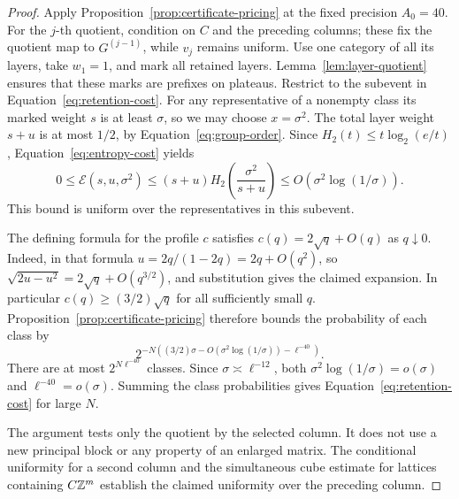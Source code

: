 \begin{proof}
Apply Proposition~\ref{prop:certificate-pricing} at the fixed precision
\(A_0=40\). For the \(j\)-th quotient, condition on \(C\) and the
preceding columns; these fix the quotient map to \(G^{(j-1)}\), while
\(v_j\) remains uniform. Use one category of all its layers, take
\(w_1=1\), and mark all retained layers. Lemma~\ref{lem:layer-quotient}
ensures that these marks are prefixes on plateaus. Restrict to the
subevent in Equation~\eqref{eq:retention-cost}. For any representative
of a nonempty class its marked weight \(s\) is at least \(\sigma\),
so we may choose \(x=\sigma^2\). The total layer weight \(s+u\) is
at most \(1/2\), by Equation~\eqref{eq:group-order}. Since
\(H_2(t)\le t\log_2(e/t)\), Equation~\eqref{eq:entropy-cost} yields
\[
 0\le\mathcal E(s,u,\sigma^2)
 \le (s+u)H_2\!\left(\frac{\sigma^2}{s+u}\right)
 \le O\!\left(\sigma^2\log(1/\sigma)\right).
\]
This bound is uniform over the representatives in this subevent.

The defining formula for the profile \(c\) satisfies
\(c(q)=2\sqrt q+O(q)\) as \(q\downarrow0\). Indeed, in that formula
\(u=2q/(1-2q)=2q+O(q^2)\), so
\(\sqrt{2u-u^2}=2\sqrt q+O(q^{3/2})\), and substitution gives the
claimed expansion. In particular \(c(q)\ge(3/2)\sqrt q\) for all
sufficiently small \(q\). Proposition~\ref{prop:certificate-pricing}
therefore bounds the probability of each class by
\[
 2^{-N\left((3/2)\sigma
       -O(\sigma^2\log(1/\sigma))-\ell^{-40}\right)}.
\]
There are at most \(2^{N\ell^{-40}}\) classes. Since
\(\sigma\asymp\ell^{-12}\), both
\(\sigma^2\log(1/\sigma)=o(\sigma)\) and
\(\ell^{-40}=o(\sigma)\). Summing the class probabilities gives
Equation~\eqref{eq:retention-cost} for large \(N\).

The argument tests only the quotient by the selected column. It does not
use a new principal block or any property of an enlarged matrix. The
conditional uniformity for a second column and the simultaneous cube
estimate for lattices containing \(C\mathbb Z^m\) establish the claimed
uniformity over the preceding column.
\end{proof}
